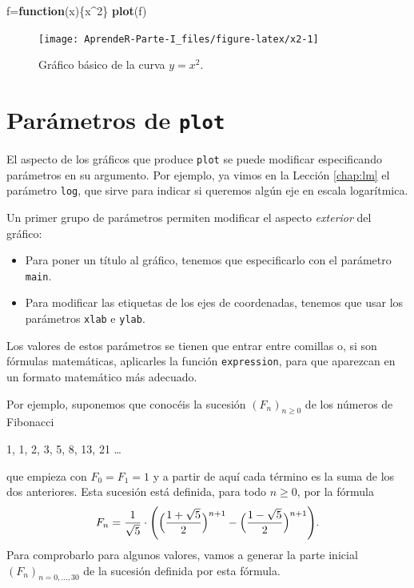 \documentclass[]{book}
\newenvironment{Shaded}{\begin{snugshade}}{\end{snugshade}}
\newcommand{\ControlFlowTok}[1]{\textcolor[rgb]{0.13,0.29,0.53}{\textbf{#1}}}
\newcommand{\DecValTok}[1]{\textcolor[rgb]{0.00,0.00,0.81}{#1}}
\newcommand{\KeywordTok}[1]{\textcolor[rgb]{0.13,0.29,0.53}{\textbf{#1}}}
\newcommand{\NormalTok}[1]{#1}
\newcommand{\OperatorTok}[1]{\textcolor[rgb]{0.81,0.36,0.00}{\textbf{#1}}}
\providecommand{\tightlist}{%
  \setlength{\itemsep}{0pt}\setlength{\parskip}{0pt}}
\theoremstyle{definition}
\theoremstyle{definition}
\theoremstyle{definition}
\theoremstyle{remark}
\begin{document}
\begin{Shaded}
\begin{Highlighting}[]
\NormalTok{f=}\ControlFlowTok{function}\NormalTok{(x)\{x}\OperatorTok{^}\DecValTok{2}\NormalTok{\}}
\KeywordTok{plot}\NormalTok{(f)}
\end{Highlighting}
\end{Shaded}

\begin{figure}

{\centering \texttt{[image: AprendeR-Parte-I\_files/figure-latex/x2-1]} 

}

\caption{Gráfico básico de la curva $y=x^2$.}\label{fig:x2}
\end{figure}

\hypertarget{parametros-de-plot}{%
\section{\texorpdfstring{Parámetros de \texttt{plot}}{Parámetros de plot}}\label{parametros-de-plot}}

El aspecto de los gráficos que produce \texttt{plot} se puede modificar especificando parámetros en su argumento. Por ejemplo, ya vimos en la Lección \ref{chap:lm} el parámetro \texttt{log}, que sirve para indicar si queremos algún eje en escala logarítmica.

Un primer grupo de parámetros permiten modificar el aspecto \emph{exterior} del gráfico:

\begin{itemize}
\tightlist
\item
  Para poner un título al gráfico, tenemos que especificarlo con el parámetro \texttt{main}.
\item
  Para modificar las etiquetas de los ejes de coordenadas, tenemos que usar los parámetros \texttt{xlab} e \texttt{ylab}.
\end{itemize}

Los valores de estos parámetros se tienen que entrar entre comillas o, si son fórmulas matemáticas, aplicarles la función \texttt{expression}, para que aparezcan en un formato matemático más adecuado.

Por ejemplo, suponemos que conocéis la sucesión \((F_n)_{n\geqslant 0}\) de los números de Fibonacci

1, 1, 2, 3, 5, 8, 13, 21 \ldots{}

que empieza con \(F_0=F_1=1\) y a partir de aquí cada término es la suma de los dos anteriores. Esta sucesión está definida, para todo \(n\geqslant 0\), por la fórmula
\[
F_n=\frac{1}{\sqrt{5}}\cdot\Biggl(
\Bigl(\frac{1+\sqrt{5}}{2}\Bigr)^{n+1}-
\Bigl(\frac{1-\sqrt{5}}{2}\Bigr)^{n+1}\Biggl).
\]
Para comprobarlo para algunos valores, vamos a generar la parte inicial \((F_n)_{n=0, \ldots, 30}\) de la sucesión definida por esta fórmula.
\end{document}
